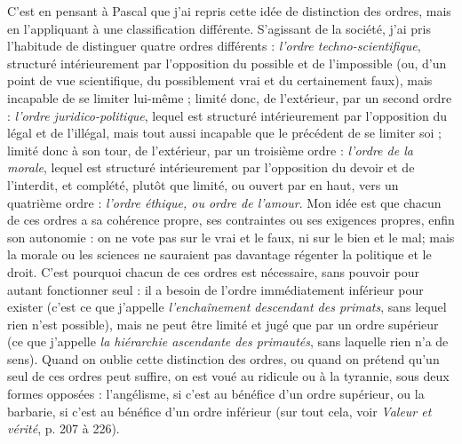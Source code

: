 C’est en pensant à Pascal que j’ai repris cette idée de distinction des ordres,
mais en l’appliquant à une classification différente. S'agissant de la société, j'ai
pris l’habitude de distinguer quatre ordres différents : {\it l'ordre techno-scientifique},
structuré intérieurement par l'opposition du possible et de l'impossible (ou,
d’un point de vue scientifique, du possiblement vrai et du certainement faux),
mais incapable de se limiter lui-même ; limité donc, de l’extérieur, par un
second ordre : {\it l'ordre juridico-politique}, lequel est structuré intérieurement par
l'opposition du légal et de l’illégal, mais tout aussi incapable que le précédent
de se limiter soi ; limité donc à son tour, de l’extérieur, par un troisième ordre :
{\it l'ordre de la morale}, lequel est structuré intérieurement par l'opposition du
devoir et de l’interdit, et complété, plutôt que limité, ou ouvert par en haut,
vers un quatrième ordre : {\it l'ordre éthique, ou ordre de l'amour}. Mon idée est que
chacun de ces ordres a sa cohérence propre, ses contraintes ou ses exigences
propres, enfin son autonomie : on ne vote pas sur le vrai et le faux, ni sur le
bien et le mal; mais la morale ou les sciences ne sauraient pas davantage
régenter la politique et le droit. C’est pourquoi chacun de ces ordres est nécessaire,
sans pouvoir pour autant fonctionner seul : il a besoin de l’ordre immédiatement
inférieur pour exister (c’est ce que j'appelle {\it l'enchaînement descendant
des primats}, sans lequel rien n’est possible), mais ne peut être limité et jugé
que par un ordre supérieur (ce que j'appelle {\it la hiérarchie ascendante des primautés},
sans laquelle rien n’a de sens). Quand on oublie cette distinction des
ordres, ou quand on prétend qu’un seul de ces ordres peut suffire, on est voué
au ridicule ou à la tyrannie, sous deux formes opposées : l’angélisme, si c’est au
bénéfice d’un ordre supérieur, ou la barbarie, si c’est au bénéfice d’un ordre
inférieur (sur tout cela, voir {\it Valeur et vérité}, p. 207 à 226).

